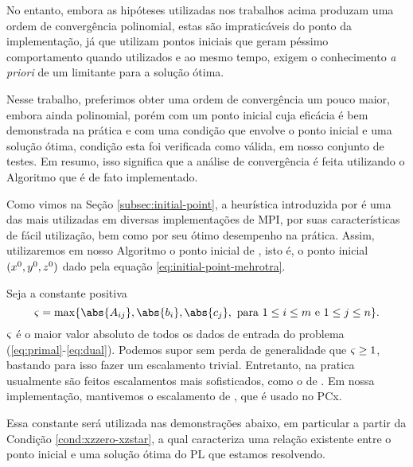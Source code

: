 No entanto, embora as hipóteses  utilizadas nos trabalhos acima produzam uma ordem de convergência  polinomial, estas são impraticáveis do ponto da implementação, já que utilizam pontos iniciais que geram péssimo comportamento quando utilizados e ao mesmo tempo, exigem o conhecimento \emph{a priori}  de um limitante para a solução  ótima. 

Nesse trabalho, preferimos  obter uma ordem de convergência um pouco maior, embora ainda polinomial, porém com um ponto inicial cuja eficácia é bem demonstrada na prática e com uma condição que envolve o ponto inicial e uma solução ótima, condição esta foi verificada como válida, em nosso conjunto de testes. Em resumo, isso significa que a análise de convergência é feita utilizando o Algoritmo que é de fato implementado.


Como vimos na Seção \ref{subsec:initial-point}, a heurística introduzida por \textcite{Mehrotra:1992wr} é uma das mais utilizadas em diversas implementações de \acl{MPI}, por suas características de fácil utilização, bem como por seu  ótimo desempenho na prática.  Assim,  utilizaremos em nosso Algoritmo o ponto inicial de \citeauthor{Mehrotra:1992wr}, isto é, o ponto inicial $(x^0 ,y^0,z^0 )$  dado pela equação \eqref{eq:initial-point-mehrotra}. 



 Seja a constante positiva 
\begin{equation}
	\label{eq:max-norm-data}
 	\bdxzstar = \max\{\abs{A_{ij}},\abs{b_{i}},\abs{c_{j}}, \text{ para } 1\leq i\leq m \text{ e } 1\leq j \leq n  \}.
\end{equation}
$\varsigma$ é o maior valor absoluto de todos os dados de entrada do problema (\ref{eq:primal}-\ref{eq:dual}). Podemos supor sem perda de generalidade que $\varsigma \geq  1$,  bastando para isso fazer um escalamento trivial. Entretanto, na pratica usualmente são feitos escalamentos mais sofisticados, como o de \textcite{Curtis:1972cp}. Em nossa implementação, mantivemos o escalamento de \citeauthor{Curtis:1972cp}, que é  usado no PCx.

Essa constante será utilizada nas demonstrações abaixo, em particular a partir da Condição \ref{cond:xzzero-xzstar}, a qual caracteriza uma relação existente entre  o ponto inicial e uma solução ótima do \ac{PL} que estamos resolvendo. 

